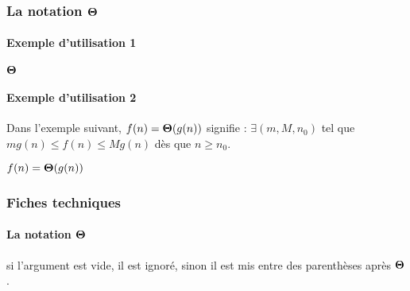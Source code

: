 \documentclass[12pt,a4paper]{article}
\begin{document}
\subsubsection{\texorpdfstring{La notation $\bigtheta{}$}%
                              {La notation "grand Theta"}}

\paragraph{Exemple d'utilisation 1}

\begin{latexex}
$\bigtheta{}$
\end{latexex}




\paragraph{Exemple d'utilisation 2}

Dans l'exemple suivant, $f(n) = \bigtheta{g(n)}$ signifie : $\exists (m, M, n_0)$ tel que $m g(n) \leqslant f(n) \leqslant M g(n)$ dès que $n \geqslant n_0$.

\begin{latexex}
$f(n) = \bigtheta{g(n)}$
\end{latexex}




\subsubsection{Fiches techniques}

\paragraph{\texorpdfstring{La notation $\bigtheta{}$}%
                          {La notation "grand Theta"}}


\IDarg{} si l'argument est vide, il est ignoré, sinon il est mis entre des parenthèses après $\bigtheta{}$.
\end{document}
